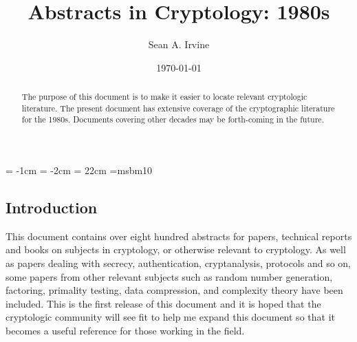\voffset = -1cm \hoffset = -2cm	 \vsize = 22cm \textwidth 160mm \textheight 220mm
\font\BBb=msbm10

%
%

%
%
\def\deg{\mathop{\rm deg}\nolimits}	\def\min{\mathop{\rm min}\nolimits}
\def\max{\mathop{\rm max}\nolimits}	\def\mod{\mathop{\rm mod}\nolimits}
\def\Z{\mbox{\BBb Z}}	\def\N{\mbox{\BBb N}}	\def\R{\mbox{\BBb R}}
\def\F{\mbox{\BBb F}}	\def\st{:}		\def\BB{\mbox{$\bullet$}}

%
%
\def\T#1{{\par\subsection*{#1}}}
\def\A#1{{{\em #1\index{#1}.\ }}}
\def\E#1{{{\em #1\index{#1} (ed.).\ }}}
\def\J#1{{\par\vspace {0.2cm}\noindent{#1}}}
\def\D#1{({#1})}
\def\X#1{{\par\vspace {0.2cm}\noindent #1}}

\title{Abstracts in Cryptology: 1980s}
\author{Sean A. Irvine}
\date{\today}


\small
\maketitle

\begin{abstract}
The purpose of this document is to make it easier to locate relevant cryptologic literature. The present document has extensive coverage of the cryptographic literature for the 1980s. Documents covering other decades may be forth-coming in the future.
\end{abstract}

\subsection*{Introduction}

This document contains over eight hundred abstracts for papers, technical reports and books on subjects in cryptology, or otherwise relevant to cryptology. As well as papers dealing with secrecy, authentication, cryptanalysis, protocols and so on, some papers from other relevant subjects such as random number generation, factoring, primality testing, data compression, and complexity theory have been included. This is the first release of this document and it is hoped that the cryptologic community will see fit to help me expand this document so that it becomes a useful reference for those working in the field.

